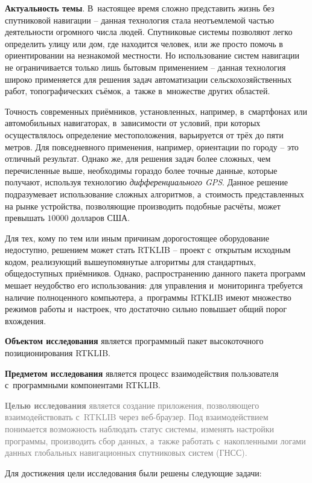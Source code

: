 
\textbf{Актуальность темы}. В~настоящее время сложно представить жизнь без спутниковой навигации -- данная технология стала неотъемлемой частью деятельности огромного числа людей. Спутниковые системы позволяют легко определить улицу или дом, где находится человек, или же просто помочь в ориентировании на незнакомой местности. Но использование систем навигации не ограничивается только лишь бытовым применением -- данная технология широко применяется для решения задач автоматизации сельскохозяйственных работ, топографических съёмок, а~также в~множестве других областей. \par

Точность современных приёмников, установленных, например, в~смартфонах или автомобильных навигаторах, в~зависимости от условий, при которых осуществлялось определение местоположения, варьируется от трёх до пяти метров. Для повседневного применения, например, ориентации по городу -- это отличный результат. Однако же, для решения задач более сложных, чем перечисленные выше, необходимы гораздо более точные данные, которые получают, используя технологию \textit{дифференциального GPS}. Данное решение подразумевает использование сложных алгоритмов, а~стоимость представленных на рынке устройства, позволяющие производить подобные расчёты, может превышать $10000$ долларов США. \par

Для тех, кому по тем или иным причинам дорогостоящее оборудование недоступно, решением может стать RTKLIB -- проект с~открытым исходным кодом, реализующий вышеупомянутые алгоритмы для стандартных, общедоступных приёмников. Однако, распространению данного пакета программ мешает неудобство его использования: для управления и~мониторинга требуется наличие полноценного компьютера, а~программы RTKLIB имеют множество режимов работы и~настроек, что достаточно сильно повышает общий порог вхождения. \par

\textbf{Объектом исследования} является программный пакет высокоточного позиционирования RTKLIB. \par

\textbf{Предметом исследования} является процесс взаимодействия пользователя с~программными компонентами RTKLIB. \par

\textcolor{Gray}{\textbf{Целью исследования} является создание приложения, позволяющего взаимодействовать с~RTKLIB через веб-браузер. Под взаимодействием понимается возможность наблюдать статус системы, изменять настройки программы, производить сбор данных, а~также работать с~накопленными логами данных глобальных навигационных спутниковых систем (ГНСС).} \par

Для достижения цели исследования были решены следующие задачи: